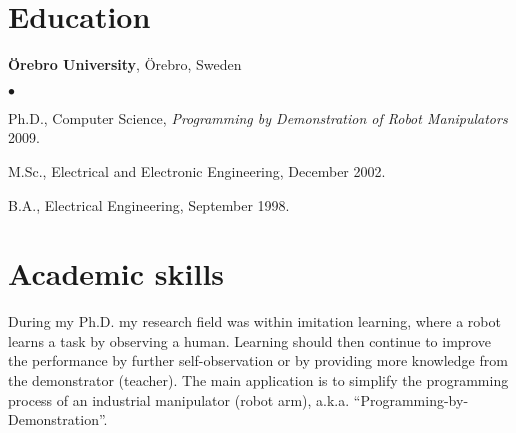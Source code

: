 \documentclass[a4paper,margin,line]{res} \usepackage{latexsym}
\newenvironment{list2}{
  \begin{list}{$\bullet$}{%
      \setlength{\itemsep}{0in} \setlength{\parsep}{0in}
      \setlength{\parskip}{0in} \setlength{\topsep}{0in}
      \setlength{\partopsep}{0in}
      \setlength{\leftmargin}{0.2in}}}{\end{list}}
\begin{document}
\begin{resume}
\section{\sc Education}
{\bf \"Orebro University}, \"Orebro, Sweden\\

\vspace*{-.1in}
\begin{list2}
\item Ph.D., Computer Science, {\it Programming by Demonstration of
  Robot Manipulators} 2009.
\vspace*{.03in}
\item M.Sc., Electrical and Electronic Engineering, December 2002.
\vspace*{.03in}
\item B.A., Electrical Engineering, September 1998.
\end{list2}

\section{\sc Academic skills}
During my Ph.D. my research field was within imitation learning, where
a robot learns a task by observing a human.  Learning should then
continue to improve the performance by further self-observation or by
providing more knowledge from the demonstrator (teacher). The main
application is to simplify the programming process of an industrial
manipulator (robot arm), a.k.a. ``Programming-by-Demonstration''.





\end{resume}
\end{document}
